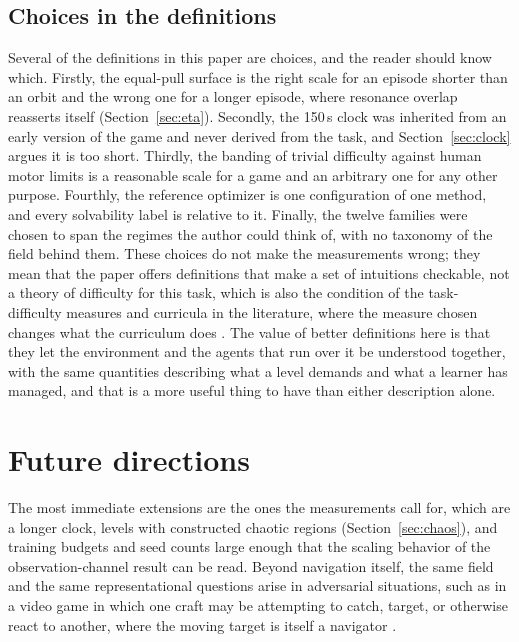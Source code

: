 \documentclass[11pt]{article}
\begin{document}
\subsection{Choices in the definitions}

Several of the definitions in this paper are choices, and the reader should
know which. Firstly, the equal-pull surface is the right scale for an
episode shorter than an orbit and the wrong one for a longer episode, where
resonance overlap reasserts itself (Section~\ref{sec:eta}). Secondly, the
150\,s clock was inherited from an early version of the game and never
derived from the task, and Section~\ref{sec:clock} argues it is too short. Thirdly, the banding of trivial difficulty against
human motor limits is a reasonable scale for a game and an arbitrary one for
any other purpose. Fourthly, the reference optimizer is one configuration of
one method, and every solvability label is relative to it. Finally, the
twelve families were chosen to span the regimes the author could think of,
with no taxonomy of the field behind them. These choices do not make the
measurements wrong; they mean that the paper offers definitions that make a
set of intuitions checkable, not a theory of difficulty for this task, which
is also the condition of the task-difficulty measures and curricula in the
literature, where the measure chosen changes what the curriculum does
\cite{furuta2021,narvekar2020,rutherford2024}. The value of better
definitions here is that they let the environment and the agents that run
over it be understood together, with the same quantities describing what a
level demands and what a learner has managed, and that is a more useful
thing to have than either description alone.

\section{Future directions}
\label{sec:future}

The most immediate extensions are the ones the measurements call for, which
are a longer clock, levels with constructed chaotic regions
(Section~\ref{sec:chaos}), and training budgets and seed counts large enough
that the scaling behavior of the observation-channel result can be read.
Beyond navigation itself, the same field and the same representational
questions arise in adversarial situations, such as in a video game in which
one craft may be attempting to catch, target, or otherwise react to another,
where the moving target is itself a navigator
\cite{mitchell2005,reif1994,dennis2020}.
\end{document}
